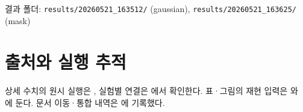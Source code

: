결과 폴더: \texttt{results/\allowbreak{}\allowbreak{}20260521\allowbreak{}\_\allowbreak{}\allowbreak{}163512/\allowbreak{}\allowbreak{}} (gaussian), \texttt{results/\allowbreak{}\allowbreak{}20260521\allowbreak{}\_\allowbreak{}\allowbreak{}163625/\allowbreak{}\allowbreak{}} (mask)



\section*{출처와 실행 추적}

상세 수치의 원시 실행은 , 실험별 연결은 에서 확인한다. 표·그림의 재현 입력은 와 에 둔다. 문서 이동·통합 내역은 에 기록했다.


